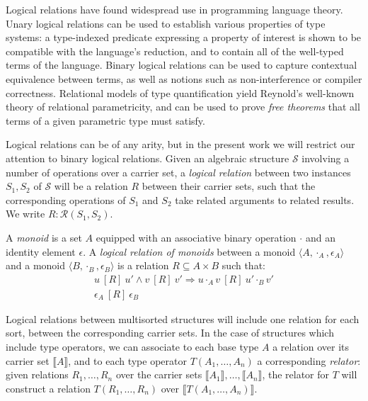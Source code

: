 \documentclass[acmsmall,timestamp,review,anonymous]{acmart}
\newcommand{\ifr}[1]{\ [{#1}]\ }
\begin{document}
Logical relations have found widespread use in programming language theory.
Unary logical relations can be used to establish
various properties of type systems:
a type-indexed predicate expressing a property of interest
is shown to be compatible with the language's reduction,
and to contain all of the well-typed terms of the language.
Binary logical relations can be used to capture
contextual equivalence between terms,
as well as notions such as non-interference or compiler correctness.
Relational models of type quantification yield
Reynold's well-known theory of relational parametricity,
and can be used to prove \emph{free theorems} that
all terms of a given parametric type must satisfy.

Logical relations can be of any arity,
but in the present work
we will restrict our attention to
binary logical relations.
Given an algebraic structure $\mathcal{S}$
involving a number of operations over a carrier set,
a \emph{logical relation}
between two instances $S_1, S_2$ of $\mathcal{S}$
will be a relation $R$
between their carrier sets,
such that the corresponding operations of $S_1$ and $S_2$
take related arguments to related results.
We write $R : \mathcal{R}(S_1, S_2)$.

\begin{example}
\label{ex:monoid}
A \emph{monoid} is a set $A$ equipped with
an associative binary operation $\cdot$ and
an identity element $\epsilon$.
A \emph{logical relation of monoids} between
a monoid $\langle A, \cdot_A, \epsilon_A \rangle$ and
a monoid $\langle B, \cdot_B, \epsilon_B \rangle$
is a relation $R \subseteq A \times B$
such that:
\begin{gather*}
u \ifr{R} u' \wedge v \ifr{R} v' \Rightarrow u \cdot_A v \ifr{R} u' \cdot_B v' \\
\epsilon_A \ifr{R} \epsilon_B
\end{gather*}
\end{example}

Logical relations between multisorted structures
will include one relation for each sort,
between the corresponding carrier sets.
In the case of structures which include type operators,
we can associate to each base type $A$
a relation over its carrier set $\llbracket A \rrbracket$,
and to each type operator $T(A_1, \ldots, A_n)$
a corresponding \emph{relator}:
given relations $R_1, \ldots, R_n$ over
the carrier sets $\llbracket A_1 \rrbracket, \ldots, \llbracket A_n \rrbracket$,
the relator for $T$
will construct a relation $T(R_1, \ldots, R_n)$
over $\llbracket T(A_1, \ldots, A_n) \rrbracket$.
\end{document}
